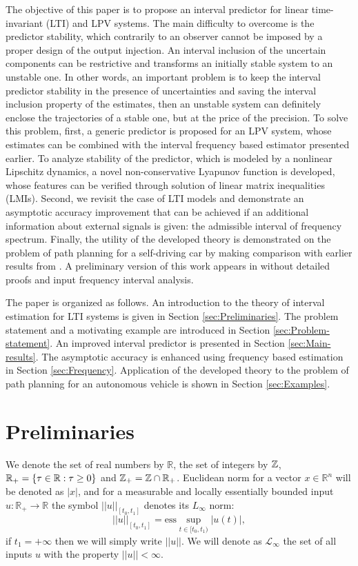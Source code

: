 \documentclass[letterpaper, 10 pt, conference]{ieeeconf}
\theoremstyle{plain}
\theoremstyle{definition}
\theoremstyle{plain}
\theoremstyle{plain}
\theoremstyle{remark}
\begin{document}
The objective of this paper is to propose an interval predictor for linear time-invariant (LTI) and LPV systems. The main difficulty to overcome is the predictor stability, which contrarily to an observer cannot be imposed by a proper design of the output injection. An interval inclusion of the uncertain components can be restrictive and transforms an initially stable system to an unstable one. In other words, an important problem is to keep the interval predictor stability in the presence of uncertainties and saving the interval inclusion property of the estimates, then an unstable system can definitely enclose the trajectories of a stable one, but at the price of the precision. To solve this problem, first, a generic predictor is proposed for an LPV system, whose estimates can be combined with the interval frequency based estimator presented earlier. To analyze stability of the predictor, which is modeled by a nonlinear Lipschitz dynamics, a novel non-conservative Lyapunov function is developed, whose features can be verified through solution of linear matrix inequalities (LMIs). Second, we revisit the case of LTI models and demonstrate an asymptotic accuracy improvement that can be achieved if an additional information about external signals is given: the admissible interval of frequency spectrum. Finally, the utility of the developed theory is demonstrated on the problem of path planning for a self-driving car by making comparison with earlier results from \cite{Leurent2018}. A preliminary version of this work appears in \cite{Leurent2019} without detailed proofs and input frequency interval analysis.

The paper is organized as follows. An introduction to the theory of interval estimation for LTI systems is given in Section \ref{sec:Preliminaries}. The problem statement and a motivating example are introduced in Section \ref{sec:Problem-statement}. An improved interval predictor is presented in Section \ref{sec:Main-results}. The asymptotic accuracy is enhanced using frequency based estimation in Section \ref{sec:Frequency}. Application of the developed theory to the problem of path planning for an autonomous vehicle is shown in Section \ref{sec:Examples}.

\section{\label{sec:Preliminaries} Preliminaries}

We denote the set of real numbers by $\mathbb{R}$, the set of integers by $\mathbb{Z}$, $\mathbb{R}_{+}=\{\tau\in\mathbb{R}:\tau\ge0\}$ and $\mathbb{Z}_{+}=\mathbb{Z}\cap\mathbb{R}_{+}$. Euclidean norm for a vector $x\in\mathbb{R}^{n}$ will be denoted as $|x|$, and for a measurable and locally essentially bounded input $u:\mathbb{R}_{+}\to\mathbb{R}$ the symbol $||u||_{[t_{0},t_{1}]}$ denotes its $L_{\infty}$ norm:
\[
||u||_{[t_{0},t_{1}]}=\text{ess}\sup_{t\in[t_{0},t_{1})}|u(t)|,
\]
if $t_{1}=+\infty$ then we will simply write $||u||$. We will denote as $\mathcal{L}_{\infty}$ the set of all inputs $u$ with the property $||u||<\infty$. 
\end{document}
